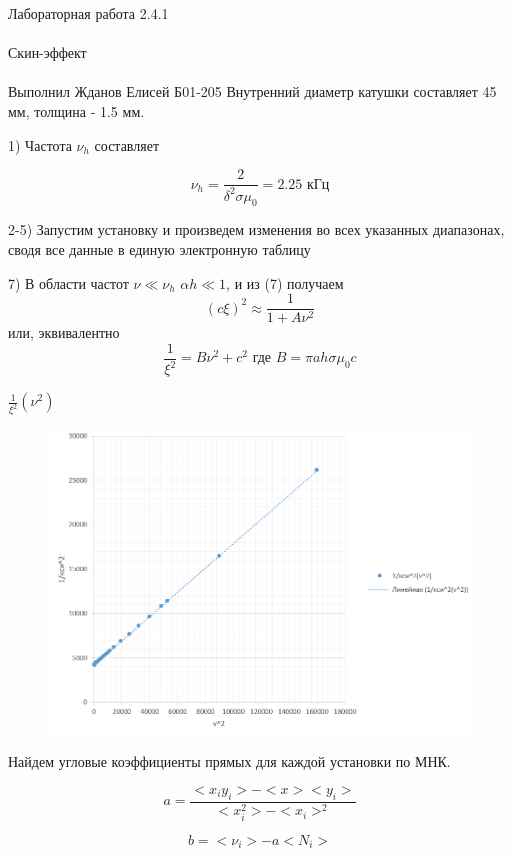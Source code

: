 \documentclass{astroedu-lab}
\begin{document}
\begin{problem}{\huge Лабораторная работа 2.4.1\\\\Скин-эффект\\\\Выполнил Жданов Елисей Б01-205}
Внутренний диаметр катушки составляет 45 мм, толщина - 1.5 мм.

1) Частота $\nu_h$ составляет

\begin{equation}
	\nu_h  = \frac{2}{\delta^2 \sigma \mu_0} = 2.25 \text{ кГц}
\end{equation}

2-5) Запустим установку и произведем изменения во всех указанных диапазонах, сводя все данные в единую электронную таблицу

7) В области частот $\nu \ll \nu_h$ $\alpha h \ll 1$, и из (7) получаем
\begin{equation*}
    {(c\xi)}^2 \approx \frac{1}{1+A\nu^2}
\end{equation*}
или, эквивалентно
\begin{equation*}
    \frac{1}{\xi^2}=B\nu^2 + c^2 \text{ где } B=\pi a h \sigma \mu_0 c
    \label{eq:liniya_dlya_c}
\end{equation*}

\begin{center}
	\Large $\frac{1}{\xi^2}(\nu^2)$
\end{center}

\begin{figure}[!h]
	\centering
	\includegraphics[width=1\textwidth]{гр1.png}
	\label{fig:boiler}
\end{figure}

Найдем угловые коэффициенты прямых для каждой установки по МНК.

\[
	a = \frac{<x_i y_i> - < x > < y_i >}{< x_i^2> - < x_i >^2}
\]

\[
	b = < \nu_i > - a < N_i >
\]


\end{problem}
\end{document}
